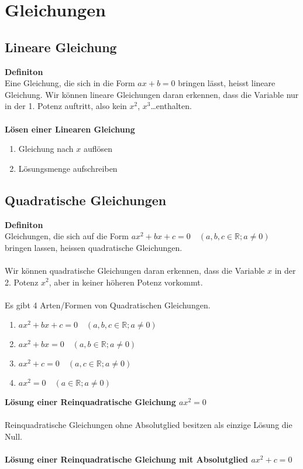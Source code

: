\section*{Gleichungen}
\begin{multicols*}{3}
    \subsection*{Lineare Gleichung}
    \textbf{Definiton} \\
    Eine Gleichung, die sich in die Form $ax + b = 0$ bringen lässt, heisst lineare Gleichung. Wir können lineare Gleichungen daran erkennen, dass die Variable nur in der 1. Potenz auftritt, also kein $x^2$, $x^3$\dots enthalten. \\\\
    \textbf{Lösen einer Linearen Gleichung}
    \begin{enumerate}
        \item Gleichung nach $x$ auflösen
        \item Lösungsmenge aufschreiben
    \end{enumerate}
    \subsection*{Quadratische Gleichungen}
    \textbf{Definiton} \\
    Gleichungen, die sich auf die Form $ax^2 + bx + c = 0 \quad (a, b, c \in \mathbb{R}; a \neq 0)$
    bringen lassen, heissen quadratische Gleichungen. 
    \\~\\
    Wir können quadratische Gleichungen daran erkennen, dass die Variable $x$ in der 2. Potenz $x^2$, aber in keiner höheren Potenz vorkommt. 
    \\~\\
    Es gibt 4 Arten/Formen von Quadratischen Gleichungen.
    \begin{enumerate}
        \item $ax^2 + bx + c = 0 \quad (a, b, c \in \mathbb{R}; a \neq 0)$
        \item $ax^2 + bx = 0 \quad (a, b \in \mathbb{R}; a \neq 0)$
        \item $ax^2 + c = 0 \quad (a, c \in \mathbb{R}; a \neq 0)$
        \item $ax^2 = 0 \quad (a \in \mathbb{R}; a \neq 0)$
    \end{enumerate}
    \textbf{Lösung einer Reinquadratische Gleichung $ax^2 = 0$}\\~\\
    Reinquadratische Gleichungen ohne Absolutglied besitzen als einzige Lösung die Null.\\~\\
    \textbf{Lösung einer Reinquadratische Gleichung mit Absolutglied $ax^2 + c = 0$}


\end{multicols*}

